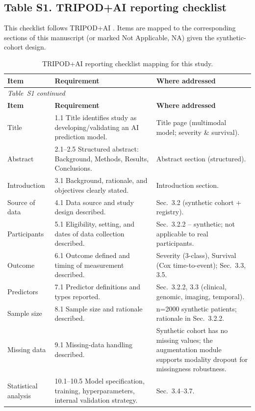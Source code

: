 \documentclass[11pt,a4paper]{article}
\begin{document}
\subsection*{Table S1. TRIPOD+AI reporting checklist}
This checklist follows TRIPOD+AI \cite{Collins2024TRIPODAI}. Items are mapped to the corresponding sections of this manuscript (or marked Not Applicable, NA) given the synthetic-cohort design.
\renewcommand{\arraystretch}{1.15}
\begin{longtable}{p{3.0cm}p{6cm}p{6cm}}
\caption{TRIPOD+AI reporting checklist mapping for this study.}\label{tab:tripod}\\
\toprule
\textbf{Item} & \textbf{Requirement} & \textbf{Where addressed} \\
\midrule\endfirsthead
\multicolumn{3}{l}{\small\textit{Table~S1 continued}}\\
\toprule
\textbf{Item} & \textbf{Requirement} & \textbf{Where addressed} \\
\midrule\endhead
\bottomrule\endfoot
Title & 1.1 Title identifies study as developing/validating an AI prediction model. & Title page (multimodal model; severity \& survival). \\
Abstract & 2.1--2.5 Structured abstract: Background, Methods, Results, Conclusions. & Abstract section (structured). \\
Introduction & 3.1 Background, rationale, and objectives clearly stated. & Introduction section. \\
Source of data & 4.1 Data source and study design described. & Sec.~3.2 (synthetic cohort + registry). \\
Participants & 5.1 Eligibility, setting, and dates of data collection described. & Sec.~3.2.2 -- synthetic; not applicable to real participants. \\
Outcome & 6.1 Outcome defined and timing of measurement described. & Severity (3-class), Survival (Cox time-to-event); Sec.~3.3, 3.5. \\
Predictors & 7.1 Predictor definitions and types reported. & Sec.~3.2.2, 3.3 (clinical, genomic, imaging, temporal). \\
Sample size & 8.1 Sample size and rationale described. & n=2000 synthetic patients; rationale in Sec.~3.2.2. \\
Missing data & 9.1 Missing-data handling described. & Synthetic cohort has no missing values; the augmentation module supports modality dropout for missingness robustness. \\
Statistical analysis & 10.1--10.5 Model specification, training, hyperparameters, internal validation strategy. & Sec.~3.4--3.7. \\

\end{longtable}
\end{document}
